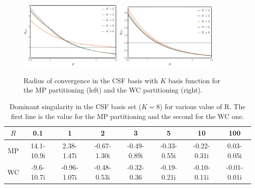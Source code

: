 \documentclass[11pt,a4paper]{article}
\begin{document}
\begin{figure}[h!]
    \centering
    \includegraphics[width=0.45\textwidth]{MPlargebasis.pdf}
    \includegraphics[width=0.45\textwidth]{WCElargebasis.pdf}
    \caption{\centering Radius of convergence in the CSF basis with $K$ basis function for the MP partitioning (left) and the WC partitioning (right).}
    \label{fig:RadiusBasis}
\end{figure}

\begin{table}[h!]
\centering
\caption{\centering Dominant singularity in the CSF basis set ($K=8$) for various value of R. The first line is the value for the MP partitioning and the second for the WC one.}
\begin{tabular}{cccccccc}
\hline
\hline
$R$ & 0.1 & 1 & 2 & 3 & 5 & 10 & 100 \\
\hline
MP & 14.1-10.9i & 2.38-1.47i & -0.67-1.30i & -0.49-0.89i & -0.33-0.55i & -0.22-0.31i & 0.03-0.05i \\
WC & -9.6-10.7i & -0.96-1.07i & -0.48-0.53i & -0.32-0.36 & -0.19-0.21i & -0.10-0.11i & -0.01-0.01i \\
\hline
\hline
\end{tabular}
\label{tab:SingAlpha}
\end{table}
\end{document}
